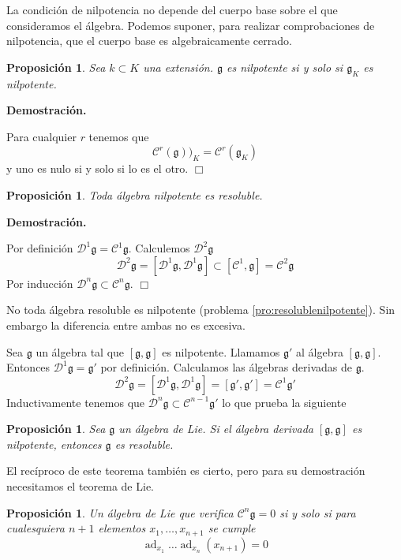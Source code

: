 \documentclass[a4paper,draft,12pt]{scrartcl}
\newtheorem{propo}[teo]{Proposición}%
\newcommand{\dem}{\noindent \textbf{Demostración. }\vspace{0.3 cm}}%
\newcommand{\g}{\mathfrak{g}}%
\newcommand{\fin}{ $\Box $ \vspace{0.4 cm}}
\newcommand{\D}{\mathcal{D}}%
\newcommand{\central}{\mathcal{C}}%
\DeclareMathOperator{\ad}{ad}  %
\begin{document}
La condición de nilpotencia no depende del cuerpo base sobre el que consideramos el álgebra.  Podemos suponer, para realizar comprobaciones de nilpotencia, que el cuerpo base es algebraicamente cerrado.

\begin{propo}

Sea $k \subset K$ una extensión. $\g$ es nilpotente si y solo si $\g_K$ es nilpotente.

\end{propo}

\dem

Para cualquier $r$ tenemos que
$$
\central^r(\g))_K= \central^r(\g_K)
$$
y uno es nulo si y solo si lo es el otro.  \fin



\begin{propo}

Toda álgebra nilpotente es resoluble.

\end{propo}

\dem

Por definición $\D^1\g= \central^1 \g$.  Calculemos $\D^2 \g$
$$
\D^2\g = [\D^1\g, \D^1\g] \subset [\central^1, \g] = \central^2 \g
$$
Por inducción $\D^n\g \subset \central^n \g$. \fin

No toda álgebra resoluble es nilpotente (problema \ref{pro:resolublenilpotente}). Sin embargo la  diferencia entre ambas no es excesiva.


Sea $\g$ un álgebra tal que $[\g,\g]$ es nilpotente.  Llamamos $\g'$ al álgebra $[\g,\g]$. Entonces $\D^1 \g= \g'$ por definición.  Calculamos las álgebras derivadas de $\g$.
$$
\D^2\g= [\D^1\g,\D^1\g]= [\g',\g']= \central^1\g'
$$
Inductivamente tenemos que $\D^n\g \subset \central^{n-1}\g'$ lo que prueba la siguiente 

\begin{propo}

Sea $\g$ un álgebra de Lie.  Si el álgebra derivada $[\g,\g]$ es nilpotente, entonces $\g$ es resoluble.

\end{propo}

El recíproco de este teorema también es cierto, pero para su demostración necesitamos el teorema de Lie.


\begin{propo}

Un álgebra de Lie que verifica $\central^n \g=0$ si y solo si para cualesquiera $n+1$ elementos $x_1, \dots , x_{n+1}$ se cumple
$$
\ad_{x_1}\dots\ad_{x_{n}}(x_{n+1})=0
$$

\end{propo}
\end{document}
